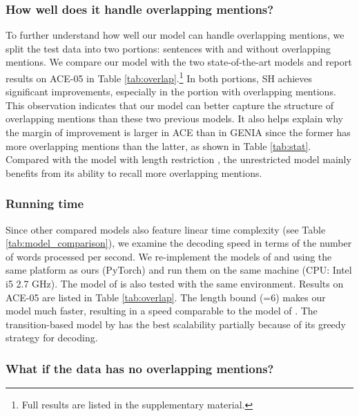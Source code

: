 \documentclass[11pt,a4paper]{article}
\theoremstyle{theorem}
\begin{document}
\subsubsection*{How well does it handle overlapping mentions?}


To further understand how well our model can handle overlapping mentions, we 
split the test data into two portions:
sentences with and without overlapping mentions.
We compare our model with the two state-of-the-art models and report results on ACE-05 in Table \ref{tab:overlap}.\footnote{Full results are listed in the supplementary material.}
In both portions, SH achieves significant improvements, especially in the portion with overlapping mentions.
This observation indicates that our model can better capture the structure of overlapping mentions than these two previous models.
{\color{black}It also helps explain why the margin of improvement is larger in ACE than in GENIA since the former has more overlapping mentions than the latter, as shown in Table \ref{tab:stat}.}
Compared with the model with length restriction , the unrestricted model mainly benefits from its ability to recall more overlapping mentions.

\subsubsection*{Running time}


Since other compared models also feature linear time complexity (see Table \ref{tab:model_comparison}),
we examine the decoding speed in terms of {\color{black} the number of words} processed per second.
We re-implement the models of \citet{lu2015joint} and \citet{muis2017labeling} using the same platform as ours (PyTorch) and run them on the same machine (CPU: Intel i5 2.7 GHz).
The model of \cite{nest-bw-em18} is also tested with the same environment. 
Results on ACE-05 are listed in Table \ref{tab:overlap}.
The length bound (=6) makes our model much faster, resulting in a  speed comparable to the model of \citet{muis2017labeling}.
The transition-based model by \cite{nest-bw-em18} has the best scalability partially because of its greedy strategy for decoding.


\subsubsection*{What if the data has no overlapping mentions?}
\end{document}
